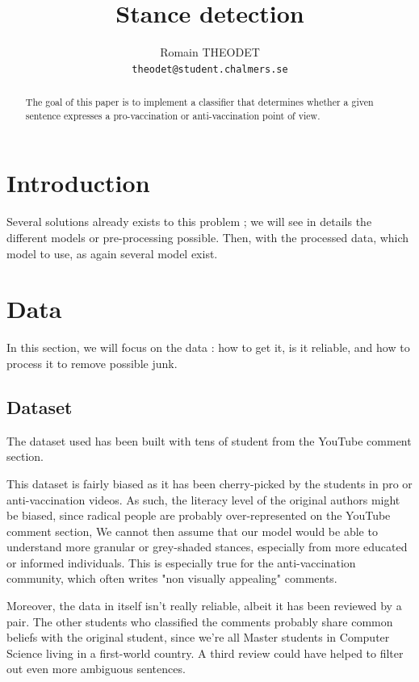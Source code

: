 \documentclass[11pt]{article}
\title{Stance detection}
\author{Romain THEODET \\
  {\tt theodet@student.chalmers.se}
}
\date{}
\begin{document}
\maketitle
\begin{abstract}
The goal of this paper is to implement a classifier that determines whether a given sentence
expresses a pro-vaccination or anti-vaccination point of view.
\end{abstract}

\section{Introduction}

Several solutions already exists to this problem ;
we will see in details the different models or pre-processing possible.
Then, with the processed data, which model to use, as again several model exist.

\section{Data}

In this section, we will focus on the data : how to get it, is it reliable,
and how to process it to remove possible junk.

\subsection{Dataset}

The dataset used has been built with tens of student from the YouTube comment section.

This dataset is fairly biased as it has been cherry-picked by the students in pro or anti-vaccination videos.
As such, the literacy level of the original authors might be biased,
since radical people are probably over-represented on the YouTube comment section,
We cannot then assume that our model would be able to understand more granular or grey-shaded stances,
especially from more educated or informed individuals.
This is especially true for the anti-vaccination community, which often writes "non visually appealing" comments.

Moreover, the data in itself isn't really reliable, albeit it has been reviewed by a pair.
The other students who classified the comments probably share common beliefs with the original student,
since we're all Master students in Computer Science living in a first-world  country. 
A third review could have helped to filter out even more ambiguous sentences.
\end{document}
